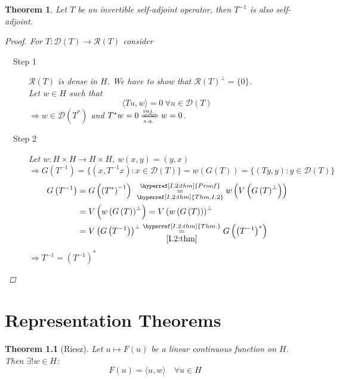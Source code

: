 \documentclass[12pt]{extreport} %
\newcommand{\DO}[1]{\mathcal{D}\left( {#1} \right)}
\newcommand{\RO}[1]{\mathcal{R}\left( {#1} \right)}
\theoremstyle{named}
\theoremstyle{nnamed}
\theoremstyle{itshape}
\newtheorem{theorem}{Theorem}  \counterwithin{theorem}{chapter}
\theoremstyle{normal}
\begin{document}
\begin{theorem}
	Let $T$ be an invertible self-adjoint operator, then $T^{-1}$ is also self-adjoint.
	
	\begin{proof}
		For $T \colon \DO{T} \rightarrow \RO{T}$ consider
		\begin{description}
			\item[~\hspace{0.25em}~Step 1] $\RO{T}$ is dense in $H$. We have to show that $\RO{T}^\perp = \{ 0 \}$. ~\\
				Let $w \in H$ such that 
					$$\langle T u, w \rangle = 0 ~\forall u \in \DO{T}$$
				$\Longrightarrow w \in \DO{T^*}$ and $T^* w = 0 \xRightarrow[s.a.]{inj.} w = 0$.
			\item[~\hspace{0.25em}~Step 2] Let $w \colon H \times H \rightarrow H \times H$, $w(x,y) = (y, x)$
			$$ \Longrightarrow G\left( T^{-1} \right) = \big\{ \left(x, T^{-1} x\right) \colon x \in \DO{T} \big\} = w\left(G\left(T\right)\right) = \big\{ \left(Ty, y\right) \colon y \in \DO{T} \big\} $$
			\begin{align*}
				G\left( T^{-1} \right) & = G \left( \left( T^* \right)^{-1} \right) ~\overset{\hyperref[I.2:thm]{Proof}}{\underset{\hyperref[I.2:thm]{Thm. I.2}}{=}} w \left( V \left( G \left(T \right)^{\perp} \right) \right) \\
				& = V \left( w \left( G \left( T \right) \right)^{\perp} \right) =  V \left( w \left( G \left( T \right) \right) \right)^{\perp} \\
				& =  V \left(  G \left( T^{-1} \right) \right)^{\perp} \overset{\hyperref[I.2:thm]{Thm.}}{\underset{\ref{I.2:thm}}{=}} G \left( \left( T^{-1} \right)^* \right)
			\end{align*}
			$\Rightarrow T^{-1} = \left( T^{-1} \right)^*$
		\end{description}
	\end{proof}
\end{theorem}


\chapter{Representation Theorems}

\begin{theorem}[Riesz]
	Let $u \mapsto F(u)$ be a linear continuous function on $H$. Then $\exists! w \in H$:
	$$ F(u) = \langle u, w \rangle \quad \forall u \in H $$
\end{theorem}
\end{document}

